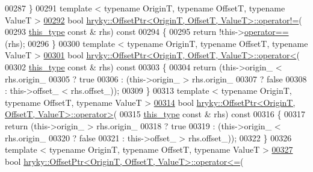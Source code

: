 \begin{DoxyCode}
00287 \}
00291 \textcolor{keyword}{template} < \textcolor{keyword}{typename} OriginT, \textcolor{keyword}{typename} OffsetT, \textcolor{keyword}{typename} ValueT >
\hypertarget{offset__ptr_8h_source_l00292}{}\hyperlink{classhryky_1_1_offset_ptr_a0f0dced452b4559cba2d4e8e5e0d30df}{00292} \textcolor{keywordtype}{bool} \hyperlink{namespacehryky_af83d27d9a54004f5981499e910bb7cb8}{hryky::OffsetPtr<OriginT, OffsetT, ValueT>::operator!=}(
00293     \hyperlink{classhryky_1_1_offset_ptr}{this_type} \textcolor{keyword}{const} & rhs)\textcolor{keyword}{ const}
00294 \textcolor{keyword}{}\{
00295     \textcolor{keywordflow}{return} !this->\hyperlink{namespacehryky_a96bfe0df0a09db56e7253330de4f2243}{operator==}(rhs);
00296 \}
00300 \textcolor{keyword}{template} < \textcolor{keyword}{typename} OriginT, \textcolor{keyword}{typename} OffsetT, \textcolor{keyword}{typename} ValueT >
\hypertarget{offset__ptr_8h_source_l00301}{}\hyperlink{classhryky_1_1_offset_ptr_a666a5072ce94ef533bbcdda9f4b7ee58}{00301} \textcolor{keywordtype}{bool} \hyperlink{namespacehryky_a7db2acd798ff6883387f9cbe3b3e820d}{hryky::OffsetPtr<OriginT, OffsetT, ValueT>::operator<}(
00302     \hyperlink{classhryky_1_1_offset_ptr}{this_type} \textcolor{keyword}{const} & rhs)\textcolor{keyword}{ const}
00303 \textcolor{keyword}{}\{
00304     \textcolor{keywordflow}{return} (this->origin\_ < rhs.origin\_
00305             ? \textcolor{keyword}{true}
00306             : (this->origin\_ > rhs.origin\_
00307                ? \textcolor{keyword}{false}
00308                : this->offset\_ < rhs.offset\_));
00309 \}
00313 \textcolor{keyword}{template} < \textcolor{keyword}{typename} OriginT, \textcolor{keyword}{typename} OffsetT, \textcolor{keyword}{typename} ValueT >
\hypertarget{offset__ptr_8h_source_l00314}{}\hyperlink{classhryky_1_1_offset_ptr_aef7f4027f9e1a75961d9f3352f153e93}{00314} \textcolor{keywordtype}{bool} \hyperlink{namespacehryky_af7f213d8e2d7f4c75ac2c93d7be56365}{hryky::OffsetPtr<OriginT, OffsetT, ValueT>::operator>}(
00315     \hyperlink{classhryky_1_1_offset_ptr}{this_type} \textcolor{keyword}{const} & rhs)\textcolor{keyword}{ const}
00316 \textcolor{keyword}{}\{
00317     \textcolor{keywordflow}{return} (this->origin\_ > rhs.origin\_
00318             ? \textcolor{keyword}{true}
00319             : (this->origin\_ < rhs.origin\_
00320                ? \textcolor{keyword}{false}
00321                : this->offset\_ > rhs.offset\_));
00322 \}
00326 \textcolor{keyword}{template} < \textcolor{keyword}{typename} OriginT, \textcolor{keyword}{typename} OffsetT, \textcolor{keyword}{typename} ValueT >
\hypertarget{offset__ptr_8h_source_l00327}{}\hyperlink{classhryky_1_1_offset_ptr_a389325e1ff9304e11d3eb8adacadff64}{00327} \textcolor{keywordtype}{bool} \hyperlink{namespacehryky_a3841c4dbefd9eeed038376b3044dec2b}{hryky::OffsetPtr<OriginT, OffsetT, ValueT>::operator<=}(

\end{DoxyCode}
